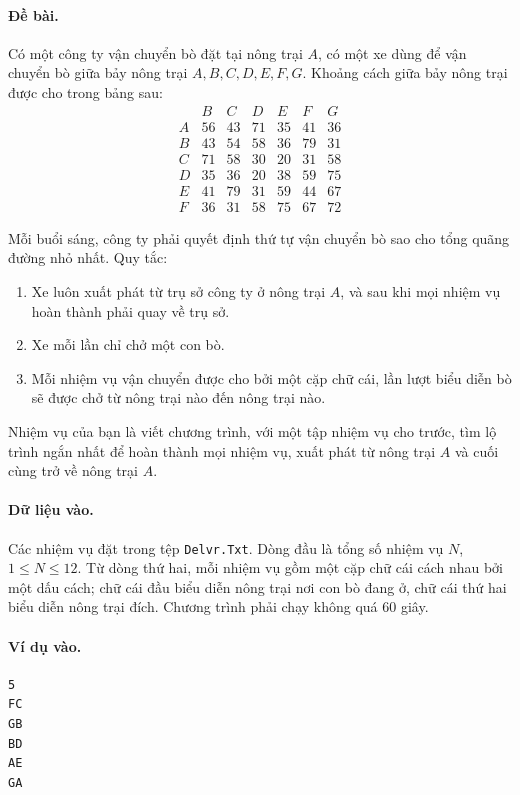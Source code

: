 \documentclass[11pt]{article}
\begin{document}
\paragraph{Đề bài.}
Có một công ty vận chuyển bò đặt tại nông trại \(A\), có một xe dùng để vận
chuyển bò giữa bảy nông trại \(A,B,C,D,E,F,G\). Khoảng cách giữa bảy nông
trại được cho trong bảng sau:
\[
\begin{array}{c|rrrrrr}
 & B & C & D & E & F & G\\ \hline
A & 56 & 43 & 71 & 35 & 41 & 36\\
B & 43 & 54 & 58 & 36 & 79 & 31\\
C & 71 & 58 & 30 & 20 & 31 & 58\\
D & 35 & 36 & 20 & 38 & 59 & 75\\
E & 41 & 79 & 31 & 59 & 44 & 67\\
F & 36 & 31 & 58 & 75 & 67 & 72
\end{array}
\]

Mỗi buổi sáng, công ty phải quyết định thứ tự vận chuyển bò sao cho tổng
quãng đường nhỏ nhất. Quy tắc:
\begin{enumerate}
  \item Xe luôn xuất phát từ trụ sở công ty ở nông trại \(A\), và sau khi mọi
  nhiệm vụ hoàn thành phải quay về trụ sở.
  \item Xe mỗi lần chỉ chở một con bò.
  \item Mỗi nhiệm vụ vận chuyển được cho bởi một cặp chữ cái, lần lượt biểu
  diễn bò sẽ được chở từ nông trại nào đến nông trại nào.
\end{enumerate}
Nhiệm vụ của bạn là viết chương trình, với một tập nhiệm vụ cho trước, tìm
lộ trình ngắn nhất để hoàn thành mọi nhiệm vụ, xuất phát từ nông trại \(A\)
và cuối cùng trở về nông trại \(A\).

\paragraph{Dữ liệu vào.}
Các nhiệm vụ đặt trong tệp \texttt{Delvr.Txt}. Dòng đầu là tổng số nhiệm vụ
\(N\), \(1\le N\le 12\). Từ dòng thứ hai, mỗi nhiệm vụ gồm một cặp chữ cái
cách nhau bởi một dấu cách; chữ cái đầu biểu diễn nông trại nơi con bò đang
ở, chữ cái thứ hai biểu diễn nông trại đích. Chương trình phải chạy không quá
60 giây.

\paragraph{Ví dụ vào.}
\begin{verbatim}
5
FC
GB
BD
AE
GA
\end{verbatim}
\end{document}
